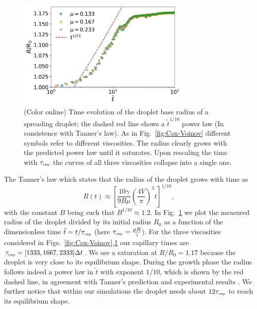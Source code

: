 \begin{figure}
    \centering
    \includegraphics[width=0.75\textwidth]{graphics/Fig_6_Tanners_law_slip_2_paper_rescaled_t.png}
    \caption{(Color online) Time evolution of the droplet base radius of a spreading droplet; the dashed red line shows a $\tilde{t}^{1/10}$ power law (In consistence with Tanner's law). As in Fig.~\ref{fig:Cox-Voinov} different symbols refer to different viscosities. The radius clearly grows with the predicted power law until it saturates. Upon rescaling the time with $\tau_{\mbox{\tiny{cap}}}$ the curves of all three viscosities collapse into a single one.}
    \label{fig:Tanners_law}
\end{figure}
The Tanner's law which states that the radius of the droplet grows with time as
\begin{equation}
\label{eq:tanners_law}
    R(t)\approx \left[\frac{10\gamma}{9B\mu}\left(\frac{4V}{\pi}\right)^3 t\right]^{1/10},
\end{equation}
with the constant $B$ being such that 
$B^{1/10} \approx 1.2$.  
In Fig.~\ref{fig:Tanners_law} 
we plot the measured radius of the droplet divided by its initial radius $R_0$ as a function of the dimensionless time $\tilde{t} = t/\tau_{\mbox{\tiny{cap}}}$ 
(here $\tau_{\mbox{\tiny{cap}}} = \frac{\mu R}{\gamma}$). For the three viscosities considered 
in Figs.~\ref{fig:Cox-Voinov},\ref{fig:Tanners_law} our capillary times are 
$\tau_{\mbox{\tiny{cap}}} = [1333, 1667, 2333] \Delta t$. 
We see a saturation at $R/R_0=1.17$ because the droplet is very close to 
its equilibrium shape. During the growth phase the radius follows indeed a power law 
in $\tilde{t}$ with exponent $1/10$, which is shown by the red dashed line, in agreement with Tanner's prediction and 
experimental results \cite{rioboo2002time, jambon-puillet_carrier_shahidzadeh_brutin_eggers_bonn_2018, cazabat1986dynamics, CHEN198860}.
We further notice that within our
simulations the droplet needs about $12\tau_{\mbox{\tiny{cap}}}$ to reach its equilibrium shape.


